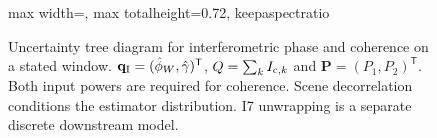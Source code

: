 \begin{figure}[H]
\begin{adjustbox}{max width=\textwidth, max totalheight=0.72\textheight, keepaspectratio}
\begin{tikzpicture}
  \end{tikzpicture}
  \end{adjustbox}
  \caption{Uncertainty tree diagram for interferometric phase and coherence on a stated window. $\mathbf q_{\rm I}=(\hat\phi_W,\hat\gamma)^{\mathsf T}$, $Q=\sum_k I_{{\rm c},k}$ and $\mathbf P=(P_1,P_2)^{\mathsf T}$. Both input powers are required for coherence. Scene decorrelation conditions the estimator distribution. I7 unwrapping is a separate discrete downstream model.}
  \label{fig:insar_traceability}
\end{figure}
